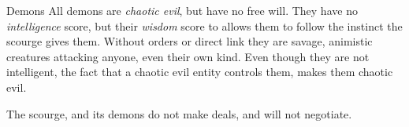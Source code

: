 \begin{35e}{Demons}
  All demons are \emph{chaotic evil}, but have no free will. They
  have no \emph{intelligence} score, but their \emph{wisdom} score to allows
  them to follow the instinct the scourge gives them. Without orders or direct
  link they are savage, animistic creatures attacking anyone, even their own
  kind. Even though they are not intelligent, the fact that a chaotic evil
  entity controls them, makes them chaotic evil.

  The scourge, and its demons do not make deals, and will not negotiate.
\end{35e}
